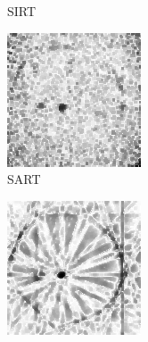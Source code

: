 \documentclass{article}
\begin{document}
\begin{figure}[!h]
\begin{subfigure}[b]{0.2\linewidth}
\captionsetup{labelformat=empty}
        \caption{SIRT}
     \end{subfigure}
    \begin{subfigure}[b]{0.2\linewidth}
        \includegraphics[width=\textwidth]{../images/potato/artefacts/no_noise/weightsIm_sart30.png}
\captionsetup{labelformat=empty}
        \caption{SART}
     \end{subfigure}
    \begin{subfigure}[b]{0.2\linewidth}
        \includegraphics[width=\textwidth]{../images/potato/artefacts/no_noise/weightsIm_fbp_sirt30.png}

\end{subfigure}
\end{figure}
\end{document}
